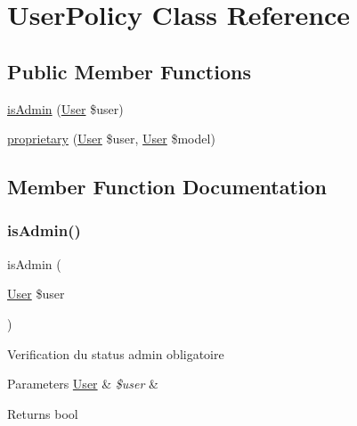 \hypertarget{class_app_1_1_policies_1_1_user_policy}{}\section{User\+Policy Class Reference}
\label{class_app_1_1_policies_1_1_user_policy}
\subsection*{Public Member Functions}
\begin{DoxyCompactItemize}
\item 
\mbox{\hyperlink{class_app_1_1_policies_1_1_user_policy_aa8e6cb724a0d6225e33c3de2d7ba8606}{is\+Admin}} (\mbox{\hyperlink{class_app_1_1_user}{User}} \$user)
\item 
\mbox{\hyperlink{class_app_1_1_policies_1_1_user_policy_a458d68be010cb3e4584061668ce62fe4}{proprietary}} (\mbox{\hyperlink{class_app_1_1_user}{User}} \$user, \mbox{\hyperlink{class_app_1_1_user}{User}} \$model)
\end{DoxyCompactItemize}


\subsection{Member Function Documentation}
\mbox{\label{class_app_1_1_policies_1_1_user_policy_aa8e6cb724a0d6225e33c3de2d7ba8606}} 
\subsubsection{\texorpdfstring{is\+Admin()}{isAdmin()}}
{\footnotesize\ttfamily is\+Admin (\begin{DoxyParamCaption}\item[{\mbox{\hyperlink{class_app_1_1_user}{User}}}]{\$user }\end{DoxyParamCaption})}

Verification du status admin obligatoire 
\begin{DoxyParams}[1]{Parameters}
\mbox{\hyperlink{class_app_1_1_user}{User}} & {\em \$user} & \\
\hline
\end{DoxyParams}
\begin{DoxyReturn}{Returns}
bool 
\end{DoxyReturn}
\mbox{\label{class_app_1_1_policies_1_1_user_policy_a458d68be010cb3e4584061668ce62fe4}} 
